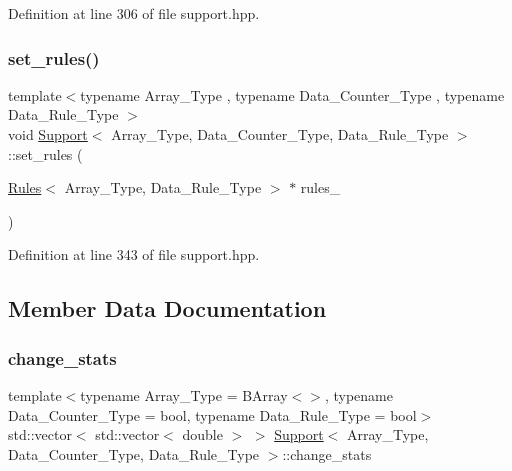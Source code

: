 Definition at line 306 of file support.\+hpp.

\mbox{\label{class_support_a66dc1a0e7097d547ea9c84df777ad477}} 
\subsubsection{\texorpdfstring{set\+\_\+rules()}{set\_rules()}}
{\footnotesize\ttfamily template$<$typename Array\+\_\+\+Type , typename Data\+\_\+\+Counter\+\_\+\+Type , typename Data\+\_\+\+Rule\+\_\+\+Type $>$ \\
void \hyperlink{class_support}{Support}$<$ Array\+\_\+\+Type, Data\+\_\+\+Counter\+\_\+\+Type, Data\+\_\+\+Rule\+\_\+\+Type $>$\+::set\+\_\+rules (\begin{DoxyParamCaption}\item[{\hyperlink{class_rules}{Rules}$<$ Array\+\_\+\+Type, Data\+\_\+\+Rule\+\_\+\+Type $>$ $\ast$}]{rules\+\_\+ }\end{DoxyParamCaption})\hspace{0.3cm}{\ttfamily [inline]}}



Definition at line 343 of file support.\+hpp.



\subsection{Member Data Documentation}
\mbox{\label{class_support_a500e5cc6eae028e6323c94641a070843}} 
\subsubsection{\texorpdfstring{change\+\_\+stats}{change\_stats}}
{\footnotesize\ttfamily template$<$typename Array\+\_\+\+Type = B\+Array$<$$>$, typename Data\+\_\+\+Counter\+\_\+\+Type = bool, typename Data\+\_\+\+Rule\+\_\+\+Type = bool$>$ \\
std\+::vector$<$ std\+::vector$<$ double $>$ $>$ \hyperlink{class_support}{Support}$<$ Array\+\_\+\+Type, Data\+\_\+\+Counter\+\_\+\+Type, Data\+\_\+\+Rule\+\_\+\+Type $>$\+::change\+\_\+stats}



